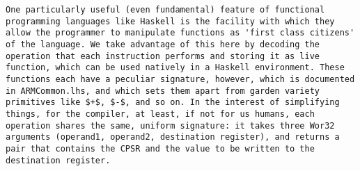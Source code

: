 \documentclass{article}
\begin{document}
\begin{Verbatim}[fontsize=\scriptsize]
One particularly useful (even fundamental) feature of functional programming languages like Haskell is the facility with which they allow the programmer to manipulate functions as 'first class citizens' of the language. We take advantage of this here by decoding the operation that each instruction performs and storing it as live function, which can be used natively in a Haskell environment. These functions each have a peculiar signature, however, which is documented in ARMCommon.lhs, and which sets them apart from garden variety primitives like $+$, $-$, and so on. In the interest of simplifying things, for the compiler, at least, if not for us humans, each operation shares the same, uniform signature: it takes three Wor32 arguments (operand1, operand2, destination register), and returns a pair that contains the CPSR and the value to be written to the destination register. 


\end{Verbatim}
\end{document}
